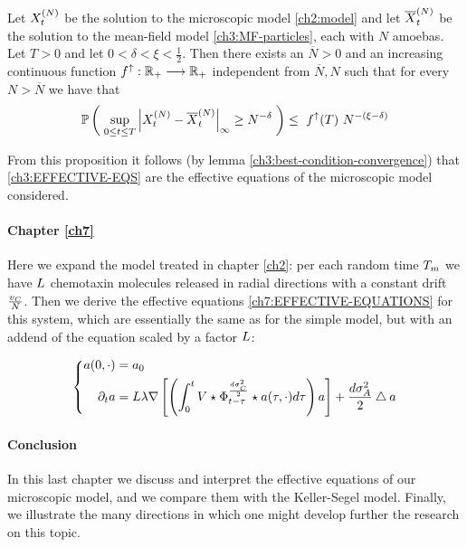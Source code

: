 \begin{proposition*}
	Let $X_t^{(N)}$ be the solution to the microscopic model \ref{ch2:model} and let $\overline{X}_t^{(N)}$ be the solution to the mean-field model \ref{ch3:MF-particles}, each with $N$ amoebas.
	Let $T > 0$ and let $0< \delta <\xi <\frac{1}{2}$.
	Then there exists an $\overline{N}>0$ and an increasing continuous function $f^\uparrow: \mathbb{R}_+ \longrightarrow \mathbb{R}_+$ independent from $\overline{N},N$ such that for every $N > \overline{N}$ we have that
	\begin{equation*}
		\mathbb{P} \left( \;   
			\sup_{0 \leq t \leq T}
			{ \left| 
				X_t^{(N)} - \overline{X}_t^{(N)}
			 \right|_{\infty} } 
			\geq
			N^{-\delta}
		 \; \right)
		\leq\
		f^\uparrow(T)\
		N^{-(\xi-\delta)}
	\end{equation*}
\end{proposition*}
From this proposition it follows (by lemma \ref{ch3:best-condition-convergence}) that \ref{ch3:EFFECTIVE-EQS} are the effective equations of the microscopic model considered.

\paragraph{Chapter \ref{ch7}} Here we expand the model treated in chapter \ref{ch2}: per each random time $T_m$ we have $L$ chemotaxin molecules released in radial directions with a constant drift $\frac{v_C}{N}$.
Then we derive the effective equations \ref{ch7:EFFECTIVE-EQUATIONS} for this system, which are essentially the same as for the simple model, but with an addend of the equation scaled by a factor $L$:

\begin{equation}
	\left\{
	\begin{aligned}
		a(0, \cdot) &= a_0
		\\
		\partial_t a &=  L\lambda \nabla \left[ \left( \int_0^t
		V \star \Phi_{t-\tau}^{\frac{d\sigma_C^2}{2}} \star a(\tau, \cdot) 
		d \tau
		\right)
		a
		\right]
		+ \frac{d\sigma_A^2}{2} \bigtriangleup a
	\end{aligned}
	\right.
\end{equation}


\paragraph{Conclusion} In this last chapter we discuss and interpret the effective equations of our microscopic model, and we compare them with the Keller-Segel model.
Finally, we illustrate the many directions in which one might develop further the research on this topic.